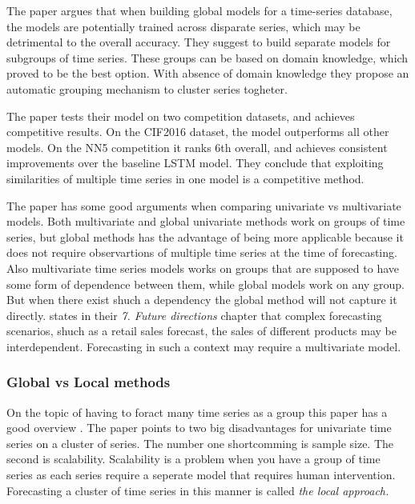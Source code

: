 The paper argues that when building global models for a time-series database, the models are
potentially trained across disparate series, which may be detrimental to the overall accuracy.
They suggest to build separate models for subgroups of time series.
These groups can be based on domain knowledge, which proved to be the best option. With absence of 
domain knowledge they propose an automatic grouping mechanism to cluster series togheter.

The paper tests their model on two competition datasets, and achieves competitive results.
On the CIF2016 dataset, the model outperforms all other models.
On the NN5 competition it ranks 6th overall, and achieves consistent improvements over the baseline LSTM model.
They conclude that exploiting similarities of multiple time series in one model
is a competitive method.

The paper \cite{Rabanser2020} has some good arguments when comparing univariate vs multivariate models.
Both multivariate and global univariate methods work on groups of time series, but global methods
has the advantage of being more applicable because it does not require observartions of multiple
time series at the time of forecasting.
Also multivariate time series models works on groups that are supposed to have some form of 
dependence between them, while global models work on any group.
But when there exist shuch a dependency the global method will not capture it directly.
\cite{Hewamalage2021} states in their \textit{7. Future directions} chapter that complex
forecasting scenarios, shuch as a retail sales forecast, the sales of different products
may be interdependent.
Forecasting in such a context may require a multivariate model.


\subsubsection{Global vs Local methods}
On the topic of having to foract many time series as a group this paper has a good overview 
\cite{Montero-Manso2021}.
The paper points to two big disadvantages for univariate time series on a cluster of series.
The number one shortcomming is sample size. The second is scalability.
Scalability is a problem when you have a group of time series as each series require a seperate model
that requires human intervention. Forecasting a cluster of time series in this manner is called
\textit{the local approach.}

